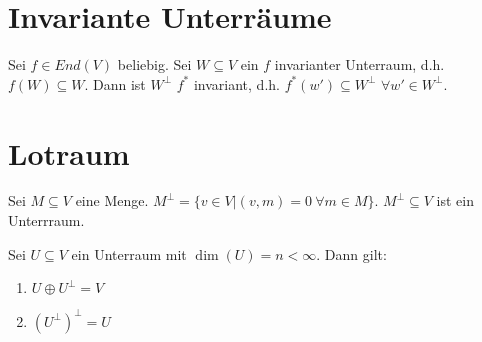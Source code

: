 \section{Invariante Unterräume}
\begin{theorem}
Sei $f \in End(V)$ beliebig. Sei $W \subseteq V$ ein $f$ invarianter Unterraum, d.h. $f(W) \subseteq W$. Dann ist $W^\perp$ $f^*$ invariant, d.h. $f^*(w') \subseteq W^\perp$ $\forall w' \in W^\perp$.
\end{theorem}

\section{Lotraum}
\begin{theorem}
Sei $M \subseteq V$ eine Menge. $M^\perp = \{v\in V | (v,m)=0~\forall m \in M\}$. $M^\perp \subseteq V$ ist ein Unterrraum.

Sei $U \subseteq V$ ein Unterraum mit $\dim(U) = n < \infty$. Dann gilt:
\begin{enumerate}
	\item $U \oplus U^\perp = V$
	\item $(U^\perp)^\perp = U$
\end{enumerate}
\end{theorem}
